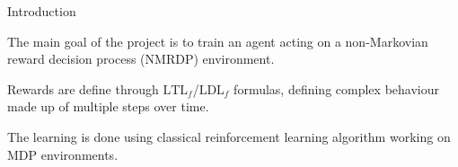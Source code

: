 \begin{frame}{Introduction}
	\begin{block}{}
    The main goal of the project is to train an agent acting on a non-Markovian reward decision process (NMRDP) environment.
	\end{block}

    \begin{block}{}
    Rewards are define through $\text{LTL}_f$/$\text{LDL}_f$ formulas, defining complex behaviour made up of multiple steps over time.
    \end{block}
    
    \begin{block}{}
    The learning is done using classical reinforcement learning algorithm working on MDP environments.
    \end{block}
\end{frame}
